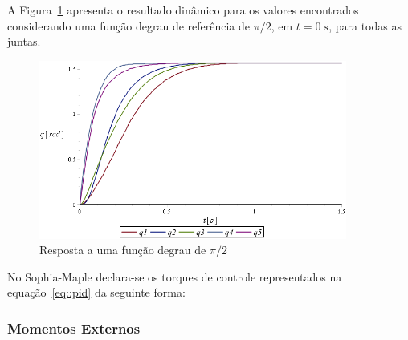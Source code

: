 A Figura~\ref{fig::pid_pi_sobre_2} apresenta o resultado dinâmico para os
valores encontrados considerando uma função degrau de referência de $\pi/2$, em
$t=0~s$, para todas as juntas.

\begin{figure}[h]
	\centering 
 	\includegraphics[width=0.90\textwidth]{figs/pid_pi_sobre_2}
 	\caption{Resposta a uma função degrau de $\pi/2$}
 	\label{fig::pid_pi_sobre_2}
\end{figure}

No Sophia-Maple declara-se os torques de controle representados na
equação~\ref{eq::pid} da seguinte forma:

\bigskip {}

\subsubsection{Momentos Externos}

